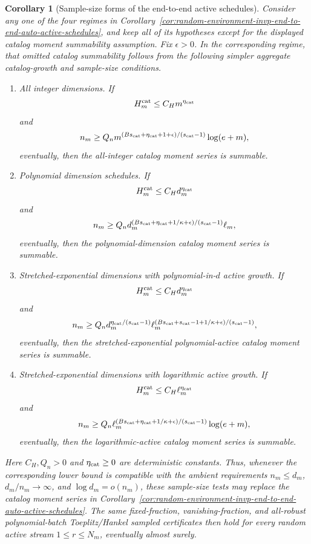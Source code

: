 \documentclass[11pt]{amsart}
\numberwithin{equation}{section}
\newtheorem{corollary}[theorem]{Corollary}
\theoremstyle{definition}
\theoremstyle{remark}
\begin{document}
\begin{corollary}[Sample-size forms of the end-to-end active schedules]
\label{cor:random-environment-invp-end-to-end-auto-active-sample-sizes}
Consider any one of the four regimes in
Corollary~\ref{cor:random-environment-invp-end-to-end-auto-active-schedules},
and keep all of its hypotheses except for the displayed catalog moment
summability assumption.  Fix \(\epsilon>0\).  In the corresponding regime, that
omitted catalog summability follows from the following simpler aggregate
catalog-growth and sample-size conditions.

\begin{enumerate}[label=\textup{(\roman*)},leftmargin=2.2em]
\item All integer dimensions.  If
\[
  H_m^{\rm cat}\le C_Hm^{\eta_{\rm cat}}
\]
and
\[
  n_m\ge
  Q_n m^{(Bs_{\rm cat}+\eta_{\rm cat}+1+\epsilon)/(s_{\rm cat}-1)}
   \log(e+m),
\]
eventually, then the all-integer catalog moment series is summable.

\item Polynomial dimension schedules.  If
\[
  H_m^{\rm cat}\le C_Hd_m^{\eta_{\rm cat}}
\]
and
\[
  n_m\ge
  Q_n d_m^{(Bs_{\rm cat}+\eta_{\rm cat}+1/\kappa+\epsilon)/(s_{\rm cat}-1)}
   \ell_m,
\]
eventually, then the polynomial-dimension catalog moment series is summable.

\item Stretched-exponential dimensions with polynomial-in-\(d\) active growth.
If
\[
  H_m^{\rm cat}\le C_Hd_m^{\eta_{\rm cat}}
\]
and
\[
  n_m\ge
  Q_n d_m^{\eta_{\rm cat}/(s_{\rm cat}-1)}
   \ell_m^{(Bs_{\rm cat}+s_{\rm cat}-1+1/\kappa+\epsilon)/(s_{\rm cat}-1)},
\]
eventually, then the stretched-exponential polynomial-active catalog moment
series is summable.

\item Stretched-exponential dimensions with logarithmic active growth.  If
\[
  H_m^{\rm cat}\le C_H\ell_m^{\eta_{\rm cat}}
\]
and
\[
  n_m\ge
  Q_n \ell_m^{(Bs_{\rm cat}+\eta_{\rm cat}+1/\kappa+\epsilon)/(s_{\rm cat}-1)}
   \log(e+m),
\]
eventually, then the logarithmic-active catalog moment series is summable.
\end{enumerate}
Here \(C_H,Q_n>0\) and \(\eta_{\rm cat}\ge0\) are deterministic constants.  Thus,
whenever the corresponding lower bound is compatible with the ambient
requirements \(n_m\le d_m\), \(d_m/n_m\to\infty\), and
\(\log d_m=o(n_m)\), these sample-size tests may replace the catalog moment
series in
Corollary~\ref{cor:random-environment-invp-end-to-end-auto-active-schedules}.
The same fixed-fraction, vanishing-fraction, and all-robust polynomial-batch
Toeplitz/Hankel sampled certificates then hold for every random active stream
\(1\le r\le N_m\), eventually almost surely.
\end{corollary}
\end{document}

